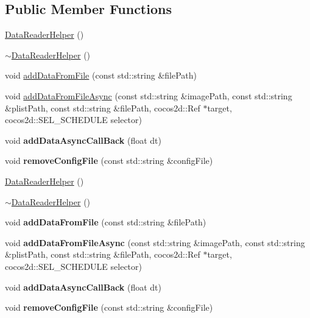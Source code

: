 \subsection*{Public Member Functions}
\begin{DoxyCompactItemize}
\item 
\hyperlink{classcocostudio_1_1DataReaderHelper_ae39a521709c689eedae55a47f622c623}{Data\+Reader\+Helper} ()
\item 
\hyperlink{classcocostudio_1_1DataReaderHelper_a12d3dc971359ceb41554b9db56140cab}{$\sim$\+Data\+Reader\+Helper} ()
\item 
void \hyperlink{classcocostudio_1_1DataReaderHelper_a95b8fde8e5e84e698dae3b938b0d414f}{add\+Data\+From\+File} (const std\+::string \&file\+Path)
\item 
void \hyperlink{classcocostudio_1_1DataReaderHelper_ae12002a304bfeff2a64ba436fbb4f7b7}{add\+Data\+From\+File\+Async} (const std\+::string \&image\+Path, const std\+::string \&plist\+Path, const std\+::string \&file\+Path, cocos2d\+::\+Ref $\ast$target, cocos2d\+::\+S\+E\+L\+\_\+\+S\+C\+H\+E\+D\+U\+LE selector)
\item 
\mbox{\label{classcocostudio_1_1DataReaderHelper_a5802a0a24c8d81780c2d0fa3e848ae93}} 
void {\bfseries add\+Data\+Async\+Call\+Back} (float dt)
\item 
\mbox{\label{classcocostudio_1_1DataReaderHelper_abbb7037f46d497a2b8640ac0ebb8bb0f}} 
void {\bfseries remove\+Config\+File} (const std\+::string \&config\+File)
\item 
\hyperlink{classcocostudio_1_1DataReaderHelper_ae39a521709c689eedae55a47f622c623}{Data\+Reader\+Helper} ()
\item 
\hyperlink{classcocostudio_1_1DataReaderHelper_a12d3dc971359ceb41554b9db56140cab}{$\sim$\+Data\+Reader\+Helper} ()
\item 
\mbox{\label{classcocostudio_1_1DataReaderHelper_a95b8fde8e5e84e698dae3b938b0d414f}} 
void {\bfseries add\+Data\+From\+File} (const std\+::string \&file\+Path)
\item 
\mbox{\label{classcocostudio_1_1DataReaderHelper_ae12002a304bfeff2a64ba436fbb4f7b7}} 
void {\bfseries add\+Data\+From\+File\+Async} (const std\+::string \&image\+Path, const std\+::string \&plist\+Path, const std\+::string \&file\+Path, cocos2d\+::\+Ref $\ast$target, cocos2d\+::\+S\+E\+L\+\_\+\+S\+C\+H\+E\+D\+U\+LE selector)
\item 
\mbox{\label{classcocostudio_1_1DataReaderHelper_a5802a0a24c8d81780c2d0fa3e848ae93}} 
void {\bfseries add\+Data\+Async\+Call\+Back} (float dt)
\item 
\mbox{\label{classcocostudio_1_1DataReaderHelper_abbb7037f46d497a2b8640ac0ebb8bb0f}} 
void {\bfseries remove\+Config\+File} (const std\+::string \&config\+File)
\end{DoxyCompactItemize}

